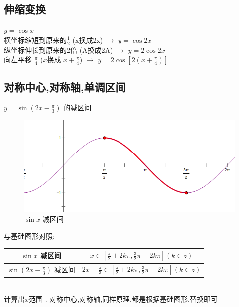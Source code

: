 \documentclass[hyperref, UTF8,11pt,a4paper]{ctexart} %
\begin{document}

\subsection {伸缩变换}
$y = \cos x$ \\
横坐标缩短到原来的$ \frac{1}{2} $ (x换成2x) $\longrightarrow$ $y= \cos 2x$ \\
纵坐标伸长到原来的2倍 (A换成2A) $\longrightarrow$ $y=  2 \cos 2x$ \\
向左平移 $\frac {\pi}{4} $  ($x$换成 $x+\frac{\pi}{4}$) $\longrightarrow$ $y=2 \cos \left[2\left(x+\frac{\pi}{4}\right)\right]$

\subsection {对称中心,对称轴,单调区间}

{\color{red}  $y=\sin \left(2 x-\frac{\pi}{3}\right)$ 的减区间} \\
\begin{figure}[h] %
	\begin{center}
		\includegraphics[scale=0.3]  {pic/sanjiaohanshu/dandiaojianqujian.png}
		\caption{$\sin x$ 减区间}
	\end{center}
\end{figure}


与基础图形对照:
\begin{tabular}{|c|c|}
	\hline
	$\sin x$ 减区间                              & $x \in\left[\frac{\pi}{2}+2 k \pi, \frac{3}{2} \pi+2 k \pi\right](k \in z)$                 \\
	\hline
	$\sin \left(2 x-\frac{\pi}{3}\right)$ 减区间 & $2 x-\frac{\pi}{3} \in\left[\frac{\pi}{2}+2 k \pi, \frac{3}{2} \pi+2 k \pi\right](k \in z)$ \\
	\hline
\end{tabular} \\
计算出$x$范围 . {\color{red}  对称中心,对称轴,同样原理,都是根据基础图形,替换即可}
\end{document}
